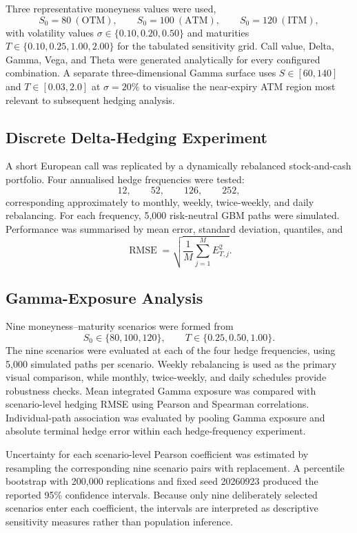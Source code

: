 \documentclass[11pt,a4paper]{article}
\begin{document}
Three representative moneyness values were used,
\[
S_0=80\ (\text{OTM}),\qquad S_0=100\ (\text{ATM}),\qquad S_0=120\ (\text{ITM}),
\]
with volatility values $\sigma\in\{0.10,0.20,0.50\}$ and maturities $T\in\{0.10,0.25,1.00,2.00\}$ for the tabulated sensitivity grid. Call value, Delta, Gamma, Vega, and Theta were generated analytically for every configured combination. A separate three-dimensional Gamma surface uses $S\in[60,140]$ and $T\in[0.03,2.0]$ at $\sigma=20\%$ to visualise the near-expiry ATM region most relevant to subsequent hedging analysis.

\subsection{Discrete Delta-Hedging Experiment}

A short European call was replicated by a dynamically rebalanced stock-and-cash portfolio. Four annualised hedge frequencies were tested:
\[
12,\qquad52,\qquad126,\qquad252,
\]
corresponding approximately to monthly, weekly, twice-weekly, and daily rebalancing. For each frequency, 5,000 risk-neutral GBM paths were simulated. Performance was summarised by mean error, standard deviation, quantiles, and
\begin{equation}
    \operatorname{RMSE}=\sqrt{\frac{1}{M}\sum_{j=1}^{M}E_{T,j}^2}.
\end{equation}

\subsection{Gamma-Exposure Analysis}

Nine moneyness--maturity scenarios were formed from
\[
S_0\in\{80,100,120\},\qquad T\in\{0.25,0.50,1.00\}.
\]
The nine scenarios were evaluated at each of the four hedge frequencies, using 5,000 simulated paths per scenario. Weekly rebalancing is used as the primary visual comparison, while monthly, twice-weekly, and daily schedules provide robustness checks. Mean integrated Gamma exposure was compared with scenario-level hedging RMSE using Pearson and Spearman correlations. Individual-path association was evaluated by pooling Gamma exposure and absolute terminal hedge error within each hedge-frequency experiment.

Uncertainty for each scenario-level Pearson coefficient was estimated by resampling the corresponding nine scenario pairs with replacement. A percentile bootstrap with 200,000 replications and fixed seed 20260923 produced the reported 95\% confidence intervals. Because only nine deliberately selected scenarios enter each coefficient, the intervals are interpreted as descriptive sensitivity measures rather than population inference.
\end{document}
